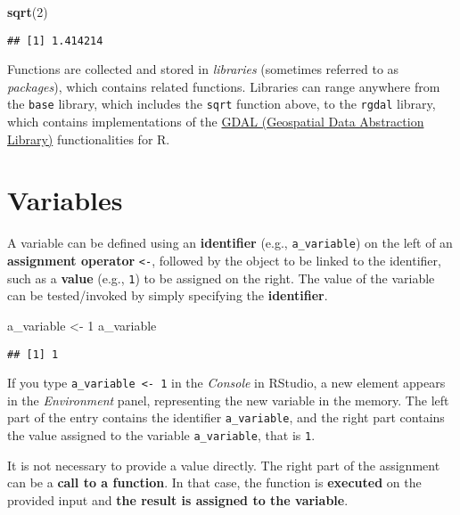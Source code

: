 \documentclass[
]{book}
\newenvironment{Shaded}{\begin{snugshade}}{\end{snugshade}}
\newcommand{\DecValTok}[1]{\textcolor[rgb]{0.00,0.00,0.81}{#1}}
\newcommand{\KeywordTok}[1]{\textcolor[rgb]{0.13,0.29,0.53}{\textbf{#1}}}
\newcommand{\NormalTok}[1]{#1}
\newcommand{\StringTok}[1]{\textcolor[rgb]{0.31,0.60,0.02}{#1}}
\begin{document}
\begin{Shaded}
\begin{Highlighting}[]
\KeywordTok{sqrt}\NormalTok{(}\DecValTok{2}\NormalTok{)}
\end{Highlighting}
\end{Shaded}

\begin{verbatim}
## [1] 1.414214
\end{verbatim}

Functions are collected and stored in \emph{libraries} (sometimes referred to as \emph{packages}), which contains related functions. Libraries can range anywhere from the \texttt{base} library, which includes the \texttt{sqrt} function above, to the \texttt{rgdal} library, which contains implementations of the \href{https://gdal.org/}{GDAL (Geospatial Data Abstraction Library)} functionalities for R.

\hypertarget{variables}{%
\section{Variables}\label{variables}}

A variable can be defined using an \textbf{identifier} (e.g., \texttt{a\_variable}) on the left of an \textbf{assignment operator} \texttt{\textless{}-}, followed by the object to be linked to the identifier, such as a \textbf{value} (e.g., \texttt{1}) to be assigned on the right. The value of the variable can be tested/invoked by simply specifying the \textbf{identifier}.

\begin{Shaded}
\begin{Highlighting}[]
\NormalTok{a_variable <-}\StringTok{ }\DecValTok{1}
\NormalTok{a_variable}
\end{Highlighting}
\end{Shaded}

\begin{verbatim}
## [1] 1
\end{verbatim}

If you type \texttt{a\_variable\ \textless{}-\ 1} in the \emph{Console} in RStudio, a new element appears in the \emph{Environment} panel, representing the new variable in the memory. The left part of the entry contains the identifier \texttt{a\_variable}, and the right part contains the value assigned to the variable \texttt{a\_variable}, that is \texttt{1}.

It is not necessary to provide a value directly. The right part of the assignment can be a \textbf{call to a function}. In that case, the function is \textbf{executed} on the provided input and \textbf{the result is assigned to the variable}.
\end{document}

